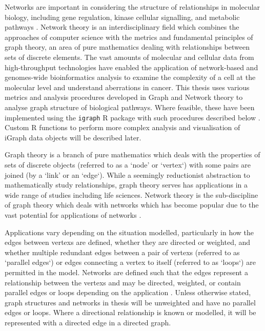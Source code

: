 Networks are important in considering the structure of relationships in molecular biology, including gene regulation, kinase cellular signalling, and metabolic \glspl{pathway} \citep{Barabasi2004}. Network theory is an interdisciplinary field which combines the approaches of computer science with the metrics and fundamental principles of graph theory, an area of pure mathematics dealing with relationships between sets of discrete elements. The vast amounts of molecular and cellular data from high-throughput technologies have enabled the application of network-based and \glspl{genome}-wide \gls{bioinformatics} analysis to examine the complexity of a cell at the molecular level and understand aberrations in cancer. This thesis uses various metrics and analysis procedures developed in Graph and Network theory to analyse \gls{graph} structure of biological \glspl{pathway}. Where feasible, these have been implemented using the \texttt{igraph} R package with such procedures described below \citep{igraph}. Custom R functions to perform more complex analysis and visualisation of iGraph data objects will be described later.

Graph theory is a branch of pure mathematics which deals with the properties of sets of discrete objects (referred to as a `node' or `vertex`) with some pairs are joined (by a `link' or an `edge`). While a seemingly reductionist abstraction to mathematically study relationships, graph theory serves has applications in a wide range of studies including life sciences. Network theory is the sub-discipline of graph theory which deals with networks which has become popular due to the vast potential for applications of networks \citep{vanSteen2010}. 

Applications vary depending on the situation modelled, particularly in how the \glspl{edge} between \glspl{vertex} are defined, whether they are directed or weighted, and whether multiple redundant \glspl{edge} between a pair of \glspl{vertex} (referred to as `parallel \glspl{edge}`) or \glspl{edge} connecting a \gls{vertex} to itself (referred to as `loops`) are permitted in the model. Networks are defined such that the \glspl{edge} represent a relationship between the \glspl{vertex} and may be directed, weighted, or contain parallel \glspl{edge} or loops depending on the application \citep{vanSteen2010}. Unless otherwise stated, \gls{graph} structures and networks in thesis will be unweighted and have no parallel \glspl{edge} or loops. Where a directional relationship is known or modelled, it will be represented with a directed \gls{edge} in a directed graph.

